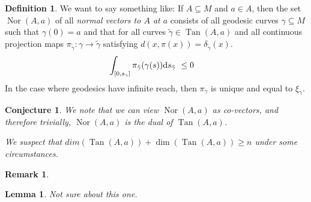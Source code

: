 \documentclass{article}
\theoremstyle{plain}
\newtheorem{conj}[thm]{Conjecture}
\newtheorem{lem}[thm]{Lemma}
\theoremstyle{definition}
\newtheorem{defn}[thm]{Definition}
\newtheorem{rem}[thm]{Remark}
\renewcommand{\(}{\left(}
\renewcommand{\)}{\right)}
\newcommand{\R}{\mathbb R}
\renewcommand{\d}{\textrm d}
\DeclareMathOperator*{\Nor}{Nor}
\DeclareMathOperator*{\Tan}{Tan}
\begin{document}
\begin{defn}
  We want to say something like:
  If $A \subseteq M$ and $a \in A$, then the set $\Nor(A,a)$ of all \emph{normal vectors to $A$ at $a$} consists of all geodesic curves $\gamma \subseteq M$ such that $\gamma(0) = a$ and that for all curves $\tilde \gamma \in \Tan(A,a)$ and all continuous projection maps $\pi_{\tilde\gamma} : \gamma \rightarrow \tilde \gamma$ satisfying $d(x,\pi(x)) = \delta_{\tilde \gamma}(x)$.
  \begin{align*}
    \int_{[0,s_{\gamma}]}\pi_{\tilde \gamma}(\gamma(s))\d s_{\tilde \gamma}\ &\leq 0
  \end{align*}
  In the case where geodesics have infinite reach, then $\pi_{\gamma}$ is unique and equal to $\xi_{\gamma}$.

\end{defn}
\begin{conj}
  We note that we can view $\Nor(A,a)$ as co-vectors, and therefore trivially, $\Nor(A,a)$ is the dual of $\Tan(A,a)$.

  We suspect that $dim(\Tan(A,a)) + \dim(\Tan(A,a)) \geq n$ under some circumstances.
\end{conj}

\begin{rem}
\end{rem}

\begin{lem}
  Not sure about this one.
\end{lem}
\end{document}
